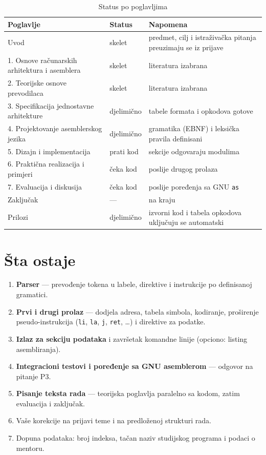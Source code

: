 \documentclass[11pt,a4paper]{article}
\newcommand{\kod}[1]{\texttt{#1}}
\begin{document}
\begin{table}[h]
  \centering
  \caption{Status po poglavljima}
  \begin{tabularx}{\textwidth}{@{}L{6.2cm}lY@{}}
    \toprule
    \textbf{Poglavlje} & \textbf{Status} & \textbf{Napomena} \\
    \midrule
    Uvod & skelet & predmet, cilj i istraživačka pitanja preuzimaju se iz prijave \\
    1. Osnove računarskih arhitektura i asemblera & skelet & literatura izabrana \\
    2. Teorijske osnove prevodilaca & skelet & literatura izabrana \\
    3. Specifikacija jednostavne arhitekture & djelimično & tabele formata i opkodova gotove \\
    4. Projektovanje asemblerskog jezika & djelimično & gramatika (EBNF) i leksička pravila definisani \\
    5. Dizajn i implementacija & prati kod & sekcije odgovaraju modulima \\
    6. Praktična realizacija i primjeri & čeka kod & poslije drugog prolaza \\
    7. Evaluacija i diskusija & čeka kod & poslije poređenja sa GNU \kod{as} \\
    Zaključak & — & na kraju \\
    Prilozi & djelimično & izvorni kod i tabela opkodova uključuju se automatski \\
    \bottomrule
  \end{tabularx}
\end{table}

\section{Šta ostaje}

\begin{enumerate}
  \item \textbf{Parser} --- prevođenje tokena u labele, direktive i instrukcije po definisanoj gramatici.
  \item \textbf{Prvi i drugi prolaz} --- dodjela adresa, tabela simbola, kodiranje,
        proširenje pseudo-instrukcija (\kod{li}, \kod{la}, \kod{j}, \kod{ret}, \dots) i direktive za podatke.
  \item \textbf{Izlaz za sekciju podataka} i završetak komandne linije (opciono: listing asembliranja).
  \item \textbf{Integracioni testovi i poređenje sa GNU asemblerom} --- odgovor na pitanje P3.
  \item \textbf{Pisanje teksta rada} --- teorijska poglavlja paralelno sa kodom, zatim evaluacija i zaključak.
  \item Vaše korekcije na prijavi teme i na predloženoj strukturi rada.
  \item Dopuna podataka: broj indeksa, tačan naziv studijskog programa i podaci o mentoru.
\end{enumerate}
\end{document}
